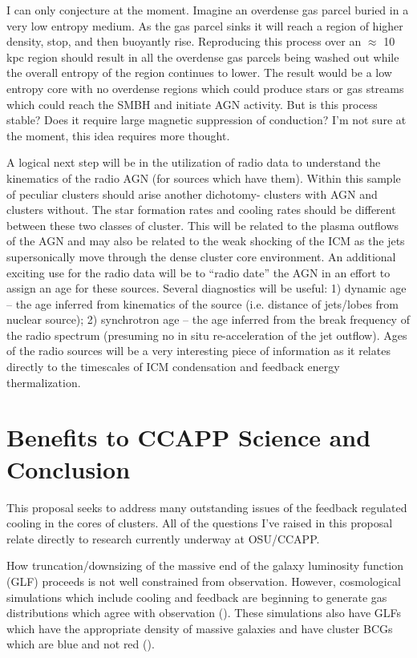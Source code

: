 \documentclass[11pt]{article}
\begin{document}
I can only conjecture at the moment. Imagine an overdense gas parcel
buried in a very low entropy medium. As the gas parcel sinks it will
reach a region of higher density, stop, and then buoyantly
rise. Reproducing this process over an $\approx$ 10 kpc region should
result in all the overdense gas parcels being washed out while the
overall entropy of the region continues to lower. The result would be
a low entropy core with no overdense regions which could produce stars
or gas streams which could reach the SMBH and initiate AGN
activity. But is this process stable? Does it require large magnetic
suppression of conduction? I'm not sure at the moment, this
idea requires more thought.

A logical next step will be in the utilization of radio data to
understand the kinematics of the radio AGN (for sources which have
them). Within this sample of peculiar clusters should arise another
dichotomy- clusters with AGN and clusters without. The star formation
rates and cooling rates should be different between these two classes
of cluster. This will be related to the plasma outflows of the AGN and
may also be related to the weak shocking of the ICM as the jets
supersonically move through the dense cluster core environment. An
additional exciting use for the radio data will be to ``radio date''
the AGN in an effort to assign an age for these sources. Several
diagnostics will be useful: 1) dynamic age -- the age inferred from
kinematics of the source (i.e. distance of jets/lobes from nuclear
source); 2) synchrotron age -- the age inferred from the break frequency
of the radio spectrum (presuming no in situ re-acceleration of the jet
outflow). Ages of the radio sources will be a very interesting piece
of information as it relates directly to the timescales of ICM
condensation and feedback energy thermalization.

\section{Benefits to CCAPP Science and Conclusion}
This proposal seeks to address many outstanding issues of the feedback
regulated cooling in the cores of clusters. All of the questions I've
raised in this proposal relate directly to research currently underway
at OSU/CCAPP.

How truncation/downsizing of the massive end of the galaxy luminosity
function (GLF) proceeds is not well constrained from
observation. However, cosmological simulations which include cooling
and feedback are beginning to generate gas distributions which agree
with observation (\cite{2007ApJ...668....1N}). These simulations also
have GLFs which have the appropriate density of massive galaxies and
have cluster BCGs which are blue and not red
(\cite{2006MNRAS.365...11C}).
\end{document}
